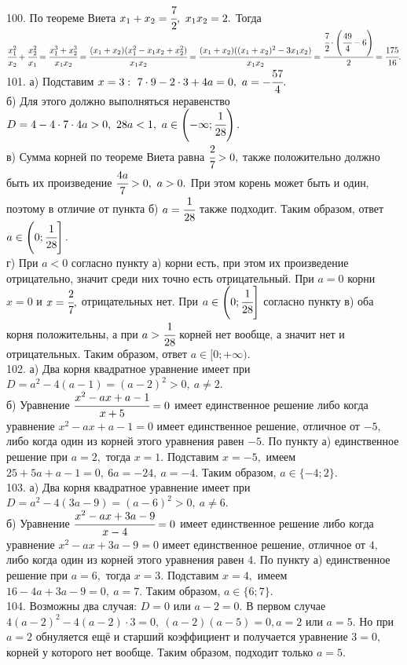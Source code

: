 100. По теореме Виета $x_1+x_2=\cfrac{7}{2},\ x_1x_2=2.$ Тогда $\cfrac{x_1^2}{x_2}+\cfrac{x_2^2}{x_1}=\cfrac{x_1^3+x_2^3}{x_1x_2}=\cfrac{(x_1+x_2)(x_1^2-x_1x_2+x_2^2)}{x_1x_2}=
\cfrac{(x_1+x_2)((x_1+x_2)^2-3x_1x_2)}{x_1x_2}=\cfrac{\cfrac{7}{2}\cdot\left(\cfrac{49}{4}-6\right)}{2}=\cfrac{175}{16}.$\\
101. а) Подставим $x=3:\ 7\cdot9-2\cdot3+4a=0,\ a=-\cfrac{57}{4}.$\\
б) Для этого должно выполняться неравенство $D=4-4\cdot7\cdot4a>0,\ 28a<1,\ a\in\left(-\infty;\cfrac{1}{28}\right).$\\
в) Сумма корней по теореме Виета равна $\cfrac{2}{7}>0,$ также положительно должно быть их произведение $\cfrac{4a}{7}>0,\ a>0.$ При этом корень может быть и один, поэтому в отличие от пункта б) $a=\cfrac{1}{28}$ также подходит. Таким образом, ответ $a\in\left(0;\cfrac{1}{28}\right].$\\
г) При $a<0$ согласно пункту а) корни есть, при этом их произведение отрицательно, значит среди них точно есть отрицательный. При $a=0$ корни $x=0$ и $x=\cfrac{2}{7},$ отрицательных нет. При $a\in\left(0;\cfrac{1}{28}\right]$ согласно пункту в) оба корня положительны, а при $a>\cfrac{1}{28}$ корней нет вообще, а значит нет и отрицательных. Таким образом, ответ $a\in[0;+\infty).$\\
102. а) Два корня квадратное уравнение имеет при $D=a^2-4(a-1)=(a-2)^2>0,\ a\neq2.$\\
б) Уравнение $\cfrac{x^2-ax+a-1}{x+5}=0$ имеет единственное решение либо когда уравнение $x^2-ax+a-1=0$ имеет единственное решение, отличное от $-5,$ либо когда один из корней этого уравнения равен $-5.$ По пункту а) единственное решение при $a=2,$ тогда $x=1.$ Подставим $x=-5,$ имеем $25+5a+a-1=0,\ 6a=-24,\ a=-4.$ Таким образом, $a\in\{-4;2\}.$\\
103. а) Два корня квадратное уравнение имеет при $D=a^2-4(3a-9)=(a-6)^2>0,\ a\neq6.$\\
б) Уравнение $\cfrac{x^2-ax+3a-9}{x-4}=0$ имеет единственное решение либо когда уравнение $x^2-ax+3a-9=0$ имеет единственное решение, отличное от $4,$ либо когда один из корней этого уравнения равен $4.$ По пункту а) единственное решение при $a=6,$ тогда $x=3.$ Подставим $x=4,$ имеем $16-4a+3a-9=0,\ a=7.$ Таким образом, $a\in\{6;7\}.$\\
104. Возможны два случая: $D=0$ или $a-2=0.$ В первом случае $4(a-2)^2-4(a-2)\cdot3=0,\ (a-2)(a-5)=0, a=2$ или $a=5.$ Но при $a=2$ обнуляется ещё и старший коэффициент и получается уравнение $3=0,$ корней у которого нет вообще. Таким образом, подходит только $a=5.$\\
